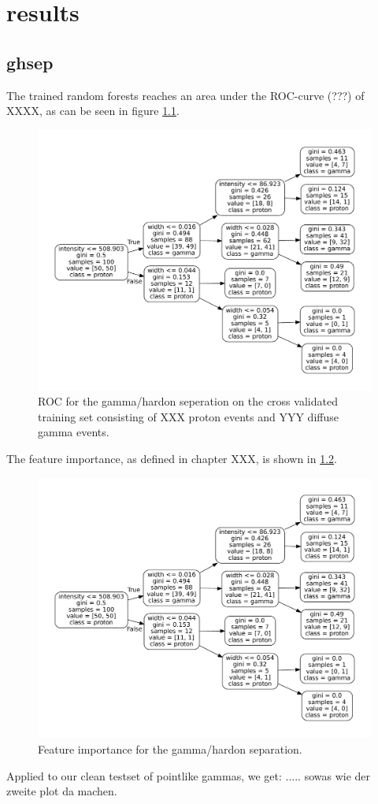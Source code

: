 \chapter{results}\label{results}

\section{ghsep}\label{ghsep}
The trained random forests reaches an area under the ROC-curve (???) 
of XXXX, as can be seen in figure \ref{fig:gh_roc}.

\begin{figure}
    \includegraphics[width=.8\textwidth]{Plots/decision_tree.pdf}
    \caption{ROC for the gamma/hardon seperation on the cross validated training set 
    consisting of XXX proton events and YYY diffuse gamma events.}
    \label{fig:gh_roc}
\end{figure}

The feature importance, as defined in chapter XXX, is shown in \ref{fig:gh_features}.
\begin{figure}
    \includegraphics[width=.8\textwidth]{Plots/decision_tree.pdf}
    \caption{Feature importance for the gamma/hardon separation.}
    \label{fig:gh_features}
\end{figure}


Applied to our clean testset of pointlike gammas, we get:
.....
sowas wie der zweite plot da machen.

